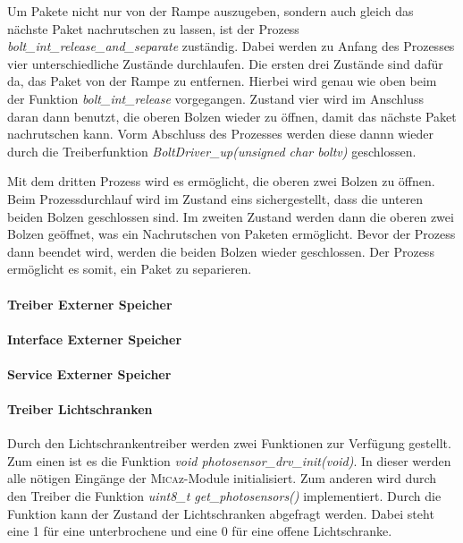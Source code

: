 Um Pakete nicht nur von der Rampe auszugeben, sondern auch gleich das nächste Paket nachrutschen zu lassen, ist der Prozess \textit{bolt\_int\_release\_and\_separate} zuständig. Dabei werden zu Anfang des Prozesses vier unterschiedliche Zustände durchlaufen. Die ersten drei Zustände sind dafür da, das Paket von der Rampe zu entfernen. Hierbei wird genau wie oben beim der Funktion \textit{bolt\_int\_release} vorgegangen. Zustand vier wird im Anschluss daran dann benutzt, die oberen Bolzen wieder zu öffnen, damit das nächste Paket nachrutschen kann. Vorm Abschluss des Prozesses werden diese dannn wieder durch die Treiberfunktion \textit{BoltDriver\_up(unsigned char boltv)} geschlossen.

Mit dem dritten Prozess wird es ermöglicht, die oberen zwei Bolzen zu öffnen. Beim Prozessdurchlauf wird im Zustand eins sichergestellt, dass die unteren beiden Bolzen geschlossen sind. Im zweiten Zustand werden dann die oberen zwei Bolzen geöffnet, was ein Nachrutschen von Paketen ermöglicht. Bevor der Prozess dann beendet wird, werden die beiden Bolzen wieder geschlossen. Der Prozess ermöglicht es somit, ein Paket zu separieren.

\paragraph{Treiber Externer Speicher}

\paragraph{Interface Externer Speicher}

\paragraph{Service Externer Speicher}

\paragraph{Treiber Lichtschranken}
Durch den Lichtschrankentreiber werden zwei Funktionen zur Verfügung gestellt. Zum einen ist es die Funktion \textit{void photosensor\_drv\_init(void)}. In dieser werden alle nötigen Eingänge der \textsc{Mica}z-Module initialisiert. Zum anderen wird durch den Treiber die Funktion \textit{uint8\_t get\_photosensors()} implementiert. Durch die Funktion kann der Zustand der Lichtschranken abgefragt werden. Dabei steht eine 1 für eine unterbrochene und eine 0 für eine offene Lichtschranke.

